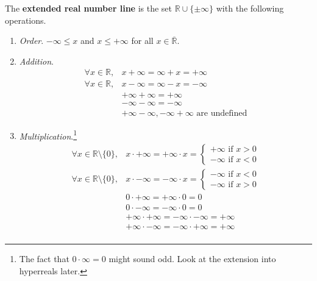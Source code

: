   \begin{definition}
    \label{def:extended-real-number-line}
    The \textbf{extended real number line} is the set $\mathbb{R} \cup \{\pm \infty\}$ with the following operations. 
    \begin{enumerate}
      \item \textit{Order}. $-\infty \leq x$ and $x \leq +\infty$ for all $x \in \overline{\mathbb{R}}$. 
      \item \textit{Addition}. 
        \begin{align}
          \forall x \in \mathbb{R}, & x + \infty = \infty + x = +\infty \\
          \forall x \in \mathbb{R}, & x - \infty = \infty - x = -\infty \\ 
          & + \infty + \infty = +\infty \\
          & - \infty - \infty = -\infty \\ 
          & +\infty - \infty, -\infty + \infty \text{ are undefined}
        \end{align}
      \item \textit{Multiplication}.\footnote{The fact that $0 \cdot \infty = 0$ might sound odd. Look at the extension into hyperreals later.} 
      \begin{align} 
        \forall x \in \mathbb{R} \setminus \{0\}, & x \cdot +\infty = +\infty \cdot x = \begin{cases} +\infty \text{ if } x > 0 \\ -\infty \text{ if } x < 0 \end{cases} \\
        \forall x \in \mathbb{R} \setminus \{0\}, & x \cdot -\infty = -\infty \cdot x = \begin{cases} -\infty \text{ if } x < 0 \\ -\infty \text{ if } x > 0 \end{cases} \\
        & 0 \cdot +\infty = +\infty \cdot 0 = 0 \\
        & 0 \cdot -\infty = -\infty \cdot 0 = 0 \\
        & +\infty \cdot +\infty = -\infty \cdot -\infty = +\infty \\ 
        & +\infty \cdot -\infty = -\infty \cdot +\infty = +\infty \\ 
      \end{align}
    \end{enumerate}
  \end{definition} 

